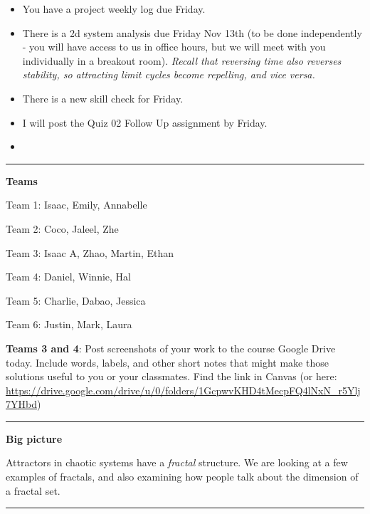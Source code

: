 \documentclass[12pt,letterpaper,noanswers]{exam}
\begin{document}
 \pdfpageheight 11in 
  \pdfpagewidth 8.5in

\noindent 




\begin{itemize}
\itemsep0em
\item You have a project weekly log due Friday.
\item There is a 2d system analysis due Friday Nov 13th (to be done independently - you will have access to us in office hours, but we will meet with you individually in a breakout room).  \emph{Recall that reversing time also reverses stability, so attracting limit cycles become repelling, and vice versa.}
\item There is a new skill check for Friday.
\item I will post the Quiz 02 Follow Up assignment by Friday.
\item 
\end{itemize}

\hrule
\vspace{0.2cm}



\noindent\textbf{Teams}

Team 1: Isaac, Emily, Annabelle

Team 2: Coco, Jaleel, Zhe

Team 3: Isaac A, Zhao, Martin, Ethan

Team 4: Daniel, Winnie, Hal

Team 5: Charlie, Dabao, Jessica

Team 6: Justin, Mark, Laura


\noindent \textbf{Teams 3 and 4}: Post screenshots of your work to the course Google Drive today.  Include words, labels, and other short notes that might make those solutions useful to you or your classmates.  Find the link in Canvas (or here: \url{https://drive.google.com/drive/u/0/folders/1GcpwvKHD4tMecpFQ4lNxN_r5Ylj7YHbd})


\vspace{0.2cm}

\hrule
\vspace{0.2cm}


\noindent\textbf{Big picture}

Attractors in chaotic systems have a \emph{fractal} structure.  We are looking at a few examples of fractals, and also examining how people talk about the dimension of a fractal set.

\vspace{0.2cm}
\hrule
\vspace{0.2cm}
\end{document}
